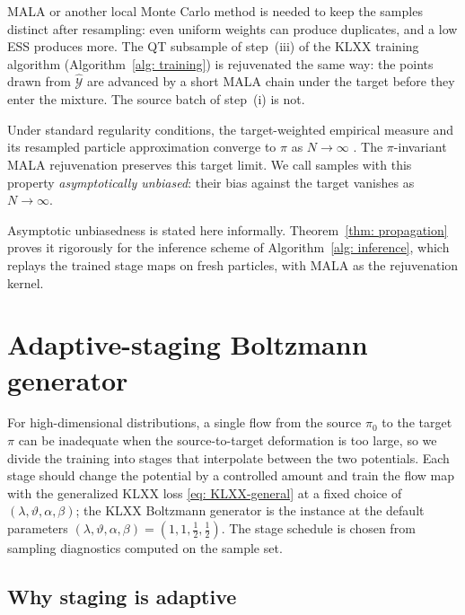 \documentclass{article}
\begin{document}
\begin{remark}
	MALA or another local Monte Carlo method is needed to keep the samples distinct after resampling: even uniform weights can produce duplicates, and a low ESS produces more. The QT subsample of step~(iii) of the KLXX training algorithm (Algorithm~\ref{alg: training}) is rejuvenated the same way: the points drawn from $\hat{\mathcal Y}$ are advanced by a short MALA chain under the target before they enter the mixture. The source batch of step~(i) is not.
\end{remark}

Under standard regularity conditions, the target-weighted empirical measure and its resampled particle approximation converge to $\pi$ as $N\to\infty$ \citep{liu2001monte,doucet2001introduction}. The $\pi$-invariant MALA rejuvenation preserves this target limit. We call samples with this property \emph{asymptotically unbiased}: their bias against the target vanishes as $N\to\infty$.

\begin{remark}
Asymptotic unbiasedness is stated here informally. Theorem~\ref{thm: propagation} proves it rigorously for the inference scheme of Algorithm~\ref{alg: inference}, which replays the trained stage maps on fresh particles, with MALA as the rejuvenation kernel.
\end{remark}

\section{Adaptive-staging Boltzmann generator}
\label{sec: boltzmann}

For high-dimensional distributions, a single flow from the source $\pi_0$ to the target $\pi$ can be inadequate when the source-to-target deformation is too large, so we divide the training into stages that interpolate between the two potentials. Each stage should change the potential by a controlled amount and train the flow map with the generalized KLXX loss \eqref{eq: KLXX-general} at a fixed choice of $(\lambda,\vartheta,\alpha,\beta)$; the KLXX Boltzmann generator is the instance at the default parameters $(\lambda,\vartheta,\alpha,\beta)=(1,1,\frac12,\frac12)$. The stage schedule is chosen from sampling diagnostics computed on the sample set.

\subsection{Why staging is adaptive}
\end{document}

